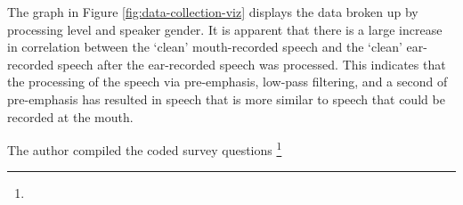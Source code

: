 The graph in Figure \ref{fig:data-collection-viz} displays the data broken up by processing level and speaker gender.  It is apparent that there is a large increase in correlation between the `clean' mouth-recorded speech and the `clean' ear-recorded speech after the ear-recorded speech was processed.  This indicates that the processing of the speech via pre-emphasis, low-pass filtering, and a second \DIFdelbegin {}\DIFdelend \DIFaddbegin {}\DIFaddend of pre-emphasis has resulted in speech that is more similar to speech that could be recorded at the mouth.

\DIFdelbegin %
\DIFdelend %
The author compiled the coded survey questions \DIFdelbegin \footnote{} %
\addtocounter{footnote}{-1}%

